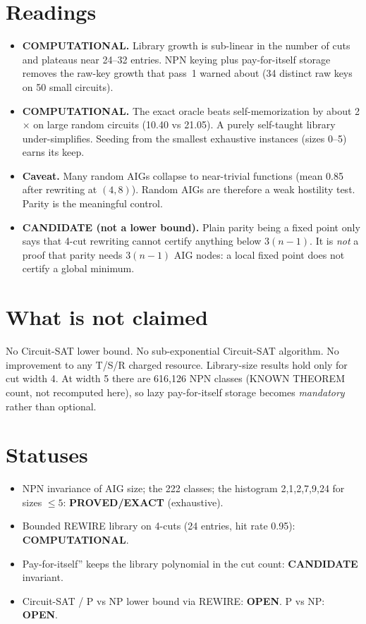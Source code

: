 \documentclass[11pt]{article}
\begin{document}
\section{Readings}
\begin{itemize}
\item \textbf{COMPUTATIONAL.} Library growth is sub-linear in the number of cuts and plateaus near 24--32 entries. NPN keying plus pay-for-itself storage removes the raw-key growth that pass~1 warned about (34 distinct raw keys on 50 small circuits).
\item \textbf{COMPUTATIONAL.} The exact oracle beats self-memorization by about 2$\times$ on large random circuits (10.40 vs 21.05). A purely self-taught library under-simplifies. Seeding from the smallest exhaustive instances (sizes 0--5) earns its keep.
\item \textbf{Caveat.} Many random AIGs collapse to near-trivial functions (mean 0.85 after rewriting at $(4,8)$). Random AIGs are therefore a weak hostility test. Parity is the meaningful control.
\item \textbf{CANDIDATE (not a lower bound).} Plain parity being a fixed point only says that 4-cut rewriting cannot certify anything below $3(n-1)$. It is \emph{not} a proof that parity needs $3(n-1)$ AIG nodes: a local fixed point does not certify a global minimum.
\end{itemize}

\section{What is not claimed}
No Circuit-SAT lower bound. No sub-exponential Circuit-SAT algorithm. No improvement to any T/S/R charged resource. Library-size results hold only for cut width 4. At width 5 there are 616{,}126 NPN classes (KNOWN THEOREM count, not recomputed here), so lazy pay-for-itself storage becomes \emph{mandatory} rather than optional.

\section{Statuses}
\begin{itemize}
\item NPN invariance of AIG size; the 222 classes; the histogram 2,1,2,7,9,24 for sizes $\le5$: \textbf{PROVED/EXACT} (exhaustive).
\item Bounded REWIRE library on 4-cuts (24 entries, hit rate 0.95): \textbf{COMPUTATIONAL}.
\item Pay-for-itself'' keeps the library polynomial in the cut count: \textbf{CANDIDATE} invariant.
\item Circuit-SAT / P vs NP lower bound via REWIRE: \textbf{OPEN}. P vs NP: \textbf{OPEN}.
\end{itemize}
\end{document}
